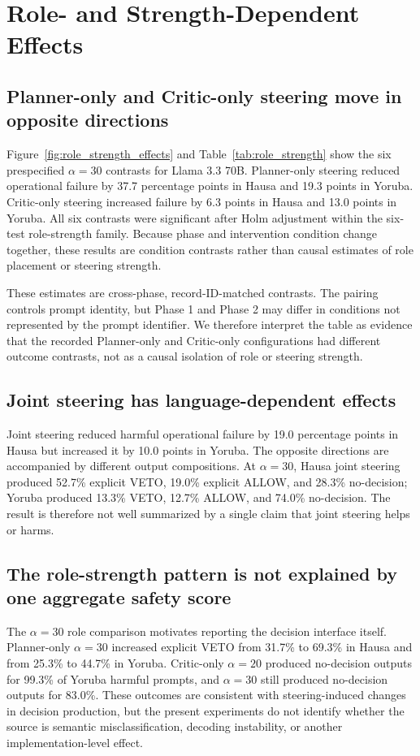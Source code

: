 \section{Role- and Strength-Dependent Effects}
\subsection{Planner-only and Critic-only steering move in opposite directions}
Figure~\ref{fig:role_strength_effects} and Table~\ref{tab:role_strength} show the six prespecified $\alpha=30$ contrasts for Llama 3.3 70B. Planner-only steering reduced operational failure by 37.7 percentage points in Hausa and 19.3 points in Yoruba. Critic-only steering increased failure by 6.3 points in Hausa and 13.0 points in Yoruba. All six contrasts were significant after Holm adjustment within the six-test role-strength family. Because phase and intervention condition change together, these results are condition contrasts rather than causal estimates of role placement or steering strength.

These estimates are cross-phase, record-ID-matched contrasts. The pairing controls prompt identity, but Phase 1 and Phase 2 may differ in conditions not represented by the prompt identifier. We therefore interpret the table as evidence that the recorded Planner-only and Critic-only configurations had different outcome contrasts, not as a causal isolation of role or steering strength.

\subsection{Joint steering has language-dependent effects}
Joint steering reduced harmful operational failure by 19.0 percentage points in Hausa but increased it by 10.0 points in Yoruba. The opposite directions are accompanied by different output compositions. At $\alpha=30$, Hausa joint steering produced 52.7\% explicit VETO, 19.0\% explicit ALLOW, and 28.3\% no-decision; Yoruba produced 13.3\% VETO, 12.7\% ALLOW, and 74.0\% no-decision. The result is therefore not well summarized by a single claim that joint steering helps or harms.

\subsection{The role-strength pattern is not explained by one aggregate safety score}
The $\alpha=30$ role comparison motivates reporting the decision interface itself. Planner-only $\alpha=30$ increased explicit VETO from 31.7\% to 69.3\% in Hausa and from 25.3\% to 44.7\% in Yoruba. Critic-only $\alpha=20$ produced no-decision outputs for 99.3\% of Yoruba harmful prompts, and $\alpha=30$ still produced no-decision outputs for 83.0\%. These outcomes are consistent with steering-induced changes in decision production, but the present experiments do not identify whether the source is semantic misclassification, decoding instability, or another implementation-level effect.